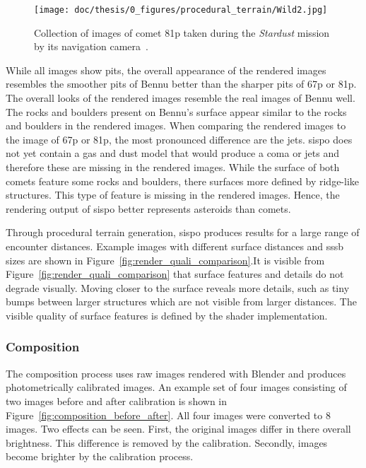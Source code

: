 \begin{figure}[htb]
    \centering
    \texttt{[image: doc/thesis/0\_figures/procedural\_terrain/Wild2.jpg]}
    \caption{Collection of images of comet \acrlong{81p} taken during the \textit{Stardust} mission by its navigation camera~\cite{StardustImages}.}
    \label{fig:render_quali_81p}
\end{figure}

While all images show pits, the overall appearance of the rendered images resembles the smoother pits of Bennu better than the sharper pits of \gls{67p} or \gls{81p}. The overall looks of the rendered images resemble the real images of Bennu well. The rocks and boulders present on Bennu's surface appear similar to the rocks and boulders in the rendered images. When comparing the rendered images to the image of \gls{67p} or \gls{81p}, the most pronounced difference are the jets. \Gls{sispo} does not yet contain a gas and dust model that would produce a coma or jets and therefore these are missing in the rendered images. While the surface of both comets feature some rocks and boulders, there surfaces more defined by ridge-like structures. This type of feature is missing in the rendered images. Hence, the rendering output of \gls{sispo} better represents asteroids than comets.

Through procedural terrain generation, \gls{sispo} produces results for a large range of encounter distances. Example images with different surface distances and \gls{sssb} sizes are shown in Figure~\ref{fig:render_quali_comparison}.It is visible from Figure~\ref{fig:render_quali_comparison} that surface features and details do not degrade visually. Moving closer to the surface reveals more details, such as tiny bumps between larger structures which are not visible from larger distances. The visible quality of surface features is defined by the shader implementation. 

\subsubsection{Composition}
The composition process uses raw images rendered with Blender and produces photometrically calibrated images. An example set of four images consisting of two images before and after calibration is shown in Figure~\ref{fig:composition_before_after}. All four images were converted to \SI{8}{\bit} images. Two effects can be seen. First, the original images differ in there overall brightness. This difference is removed by the calibration. Secondly, images become brighter by the calibration process. 

